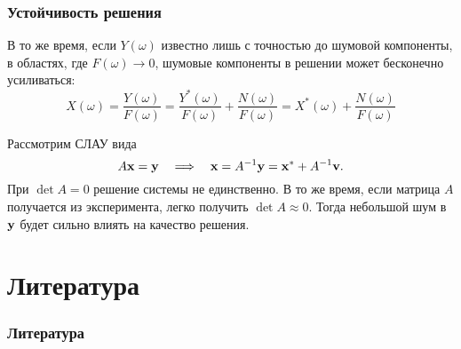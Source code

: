 \documentclass[compress]{beamer}
\begin{document}
    \begin{frame}\frametitle{Устойчивость решения}

        В то же время, если $Y(\omega)$ известно лишь с точностью до шумовой компоненты, в областях, где $F(\omega) \to 0$, шумовые компоненты в решении может бесконечно усиливаться:
        \begin{equation*}
            X(\omega) = \frac{Y(\omega)}{F(\omega)} =
                \frac{Y^*(\omega)}{F(\omega)} + \frac{N(\omega)}{F(\omega)} =
                X^*(\omega) + \frac{N(\omega)}{F(\omega)}
        \end{equation*}

        Рассмотрим СЛАУ вида
        \begin{equation*}
            A \vb{x} = \vb{y} \quad\Longrightarrow\quad
            \vb{x} = A^{-1} \vb{y} = \vb{x}^* + A^{-1} \vb{v} .
        \end{equation*}
        При $\det A = 0$ решение системы не единственно. В то же время, если матрица $A$ получается из эксперимента, легко получить $\det A \approx 0$. Тогда небольшой шум в $\vb{y}$ будет сильно влиять на качество решения.

    \end{frame}

    \section*{Литература}

    \begin{frame}\frametitle{Литература}

        {\tiny{
            \nocite{*}
            
            
        }}

    \end{frame}
\end{document}
